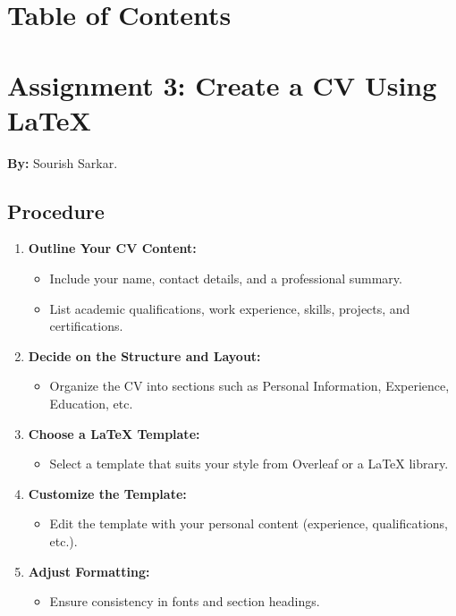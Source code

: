\documentclass[a4paper,12pt]{article}
\begin{document}
    \section*{Table of Contents}
\tableofcontents

\vspace{1cm}

\section{Assignment 3: Create a CV Using LaTeX}

\textbf{By:} Sourish Sarkar.

\subsection*{Procedure}
\begin{enumerate}
    \item \textbf{Outline Your CV Content:}
    \begin{itemize}
        \item Include your name, contact details, and a professional summary.
        \item List academic qualifications, work experience, skills, projects, and certifications.
    \end{itemize}

    \item \textbf{Decide on the Structure and Layout:}
    \begin{itemize}
        \item Organize the CV into sections such as Personal Information, Experience, Education, etc.
    \end{itemize}

    \item \textbf{Choose a LaTeX Template:}
    \begin{itemize}
        \item Select a template that suits your style from Overleaf or a LaTeX library.
    \end{itemize}

    \item \textbf{Customize the Template:}
    \begin{itemize}
        \item Edit the template with your personal content (experience, qualifications, etc.).
    \end{itemize}

    \item \textbf{Adjust Formatting:}
    \begin{itemize}
        \item Ensure consistency in fonts and section headings.
    \end{itemize}


\end{enumerate}
\end{document}
